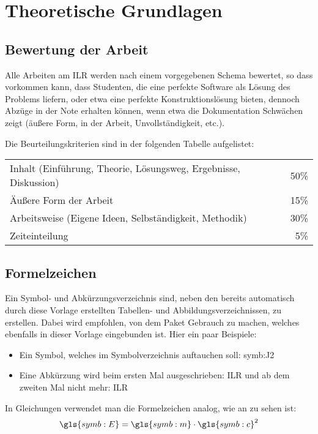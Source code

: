 \chapter{Theoretische Grundlagen}
\label{sec:grundlagen}

\section{Bewertung der Arbeit}

Alle Arbeiten am ILR werden nach einem vorgegebenen Schema bewertet, so dass vorkommen kann, dass Studenten, die eine perfekte Software als Lösung
des Problems liefern, oder etwa eine perfekte Konstruktionslösung bieten, dennoch Abzüge in der Note erhalten können,
wenn etwa die Dokumentation Schwächen zeigt (äußere Form,  in der Arbeit, Unvollständigkeit, etc.).

Die Beurteilungskriterien sind in der folgenden Tabelle aufgelistet:
\begin{table}[h!]
 \centering
 \begin{tabular}{lr}
  Inhalt (Einführung, Theorie, Lösungsweg, Ergebnisse, Diskussion) & 50\% \\
  Äußere Form der Arbeit & 15\% \\
  Arbeitsweise (Eigene Ideen, Selbständigkeit, Methodik) & 30\% \\
  Zeiteinteilung & 5\% \\
 \end{tabular}

\end{table}

\section{Formelzeichen}

Ein Symbol- und Abk\"urzungsverzeichnis sind, neben den bereits automatisch 
durch diese Vorlage erstellten Tabellen- und Abbildungsverzeichnissen, zu erstellen.
Dabei wird empfohlen, von dem Paket  Gebrauch zu machen, welches 
ebenfalls in dieser Vorlage eingebunden ist. Hier ein paar Beispiele:
\begin{itemize}
 \item Ein Symbol, welches im Symbolverzeichnis auftauchen soll: \gls{symb:J2}
 \item Eine Abk\"urzung wird beim ersten Mal ausgeschrieben: \gls{ILR} und ab dem zweiten Mal nicht mehr: \gls{ILR}
\end{itemize}
In Gleichungen verwendet man die Formelzeichen analog, wie an  zu sehen ist:
\begin{equation}
 \gls{symb:E}=\gls{symb:m}\cdot \gls{symb:c}^2 \label{eq:beispiel}
\end{equation}

